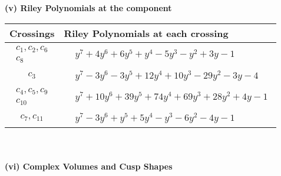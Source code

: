 \documentclass[1p]{elsarticle_modified}
\theoremstyle{definition}
\begin{document}
\newpage\renewcommand{\arraystretch}{1}
\flushleft \textbf{(v) Riley Polynomials at the component}\newline \\
\begin{tabular}{m{50pt}|m{274pt}}
Crossings & \hspace{64pt}Riley Polynomials at each crossing \\
\hline $$\begin{aligned}c_{1},c_{2},c_{6}\\c_{8}\end{aligned}$$&$\begin{aligned}
&y^7+4 y^6+6 y^5+y^4-5 y^3- y^2+3 y-1
\end{aligned}$\\
\hline $$\begin{aligned}c_{3}\end{aligned}$$&$\begin{aligned}
&y^7-3 y^6-3 y^5+12 y^4+10 y^3-29 y^2-3 y-4
\end{aligned}$\\
\hline $$\begin{aligned}c_{4},c_{5},c_{9}\\c_{10}\end{aligned}$$&$\begin{aligned}
&y^7+10 y^6+39 y^5+74 y^4+69 y^3+28 y^2+4 y-1
\end{aligned}$\\
\hline $$\begin{aligned}c_{7},c_{11}\end{aligned}$$&$\begin{aligned}
&y^7-3 y^6+y^5+5 y^4- y^3-6 y^2-4 y-1
\end{aligned}$\\
\hline
\end{tabular}\\~\\
\newpage\flushleft \textbf{(vi) Complex Volumes and Cusp Shapes}
\end{document}
